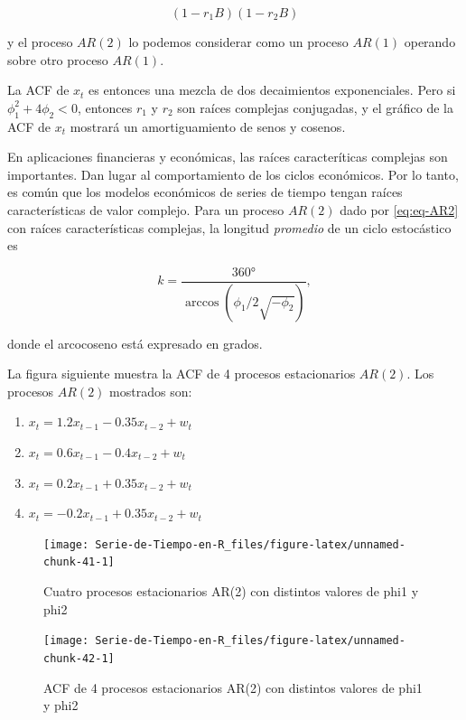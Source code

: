 \documentclass[12pt,]{krantz}
\theoremstyle{definition}
\theoremstyle{definition}
\theoremstyle{definition}
\theoremstyle{remark}
\begin{document}
\[(1-r_1B)(1-r_2B)\]

y el proceso \(AR(2)\) lo podemos considerar como un proceso \(AR(1)\)
operando sobre otro proceso \(AR(1)\).

La ACF de \(x_t\) es entonces una mezcla de dos decaimientos
exponenciales. Pero si \(\phi_1^2+4\phi_2<0\), entonces \(r_1\) y
\(r_2\) son raíces complejas conjugadas, y el gráfico de la ACF de
\(x_t\) mostrará un amortiguamiento de senos y cosenos.

En aplicaciones financieras y económicas, las raíces caracteríticas
complejas son importantes. Dan lugar al comportamiento de los ciclos
económicos. Por lo tanto, es común que los modelos económicos de series
de tiempo tengan raíces características de valor complejo. Para un
proceso \(AR(2)\) dado por \eqref{eq:eq-AR2} con raíces características
complejas, la longitud \emph{promedio} de un ciclo estocástico es

\[k=\frac{360°}{\arccos(\phi_1/2\sqrt{-\phi_2})},\]

donde el arcocoseno está expresado en grados.

La figura siguiente muestra la ACF de 4 procesos estacionarios
\(AR(2)\). Los procesos \(AR(2)\) mostrados son:

\begin{enumerate}
\def\labelenumi{\alph{enumi})}
\item
  \(x_t=1.2x_{t-1}-0.35x_{t-2}+w_t\)
\item
  \(x_t=0.6x_{t-1}-0.4x_{t-2}+w_t\)
\item
  \(x_t=0.2x_{t-1}+0.35x_{t-2}+w_t\)
\item
  \(x_t=-0.2x_{t-1}+0.35x_{t-2}+w_t\)
\end{enumerate}

\begin{figure}

{\centering \texttt{[image: Serie-de-Tiempo-en-R\_files/figure-latex/unnamed-chunk-41-1]} 

}

\caption{Cuatro procesos estacionarios AR(2) con distintos valores de phi1 y phi2}\label{fig:unnamed-chunk-41}
\end{figure}

\begin{figure}

{\centering \texttt{[image: Serie-de-Tiempo-en-R\_files/figure-latex/unnamed-chunk-42-1]} 

}

\caption{ACF de 4 procesos estacionarios AR(2) con distintos valores de phi1 y phi2}\label{fig:unnamed-chunk-42}
\end{figure}
\end{document}
